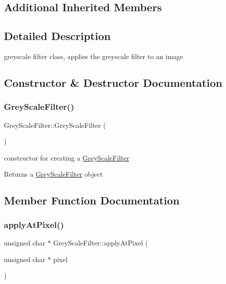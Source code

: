 \subsection*{Additional Inherited Members}


\subsection{Detailed Description}
greyscale filter class, applies the greyscale filter to an image 

\subsection{Constructor \& Destructor Documentation}
\mbox{\label{classGreyScaleFilter_a39c97682b954a5c00135eb4c13bddd47}} 
\subsubsection{\texorpdfstring{Grey\+Scale\+Filter()}{GreyScaleFilter()}}
{\footnotesize\ttfamily Grey\+Scale\+Filter\+::\+Grey\+Scale\+Filter (\begin{DoxyParamCaption}{ }\end{DoxyParamCaption})}



constructor for creating a \hyperlink{classGreyScaleFilter}{Grey\+Scale\+Filter} 

\begin{DoxyReturn}{Returns}
a \hyperlink{classGreyScaleFilter}{Grey\+Scale\+Filter} object 
\end{DoxyReturn}


\subsection{Member Function Documentation}
\mbox{\label{classGreyScaleFilter_afac3eb54599341d326d9df20de67f851}} 
\subsubsection{\texorpdfstring{apply\+At\+Pixel()}{applyAtPixel()}}
{\footnotesize\ttfamily unsigned char $\ast$ Grey\+Scale\+Filter\+::apply\+At\+Pixel (\begin{DoxyParamCaption}\item[{unsigned char $\ast$}]{pixel }\end{DoxyParamCaption})\hspace{0.3cm}{\ttfamily [virtual]}}



